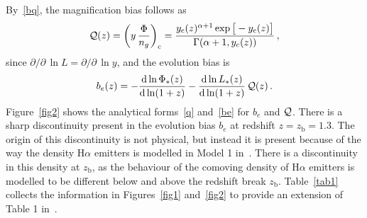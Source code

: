 By~\eqref{bq}, the magnification bias follows as
\begin{equation} \label{q}
{\cal Q}(z) ={\left( y\, \frac{\Phi}{n_g}\right)_{\mathrm{c}}}= \frac{ y_{\mathrm{c}}(z)^{{\alpha+1}}\exp\big[-y_{\mathrm{c}}(z) \big]}{\Gamma({\alpha+1}, y_c(z))}\,,
\end{equation}
since {$\partial/\partial \,{\ln L} = \partial/\partial\, {\ln y}$}, and the evolution bias is
\begin{equation} \label{be}
b_e(z) = - \frac{\mathrm{d} \ln  \Phi_*(z)}{\mathrm{d} \ln (1+z)} - \frac{ {\mathrm{d} \ln L_*}(z)}{\mathrm{d} \ln (1+z)}\,{\cal Q}(z)\,.
\end{equation}
Figure~\ref{fig2} shows the analytical forms~\eqref{q} and~\eqref{be} for $b_{e}$ and $\mathcal{Q}$. There is a sharp discontinuity present in the evolution bias $b_e$ at redshift $z = z_\mathrm{b} = 1.3$. The origin of this discontinuity is not physical, but instead it is present because of the way the density H$\alpha$ emitters is modelled in Model 1 in~\cite{Pozzetti:2016cch}. There is a discontinuity in this density at $z_\mathrm{b}$, as the behaviour of the comoving density of H$\alpha$ emitters is modelled to be different below and above the redshift break $z_\mathrm{b}$. 
Table~\ref{tab1} collects the information in Figures~\ref{fig1} and~\ref{fig2} to provide an extension of Table 1 in~\cite{Yankelevich:2018uaz}.
